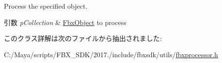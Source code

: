 Process the specified object. 
\begin{DoxyParams}{引数}
{\em p\+Collection} & \hyperlink{class_fbx_object}{Fbx\+Object} to process \\
\hline
\end{DoxyParams}


このクラス詳解は次のファイルから抽出されました\+:\begin{DoxyCompactItemize}
\item 
C\+:/\+Maya/scripts/\+F\+B\+X\+\_\+\+S\+D\+K/2017./include/fbxsdk/utils/\hyperlink{fbxprocessor_8h}{fbxprocessor.\+h}\end{DoxyCompactItemize}
